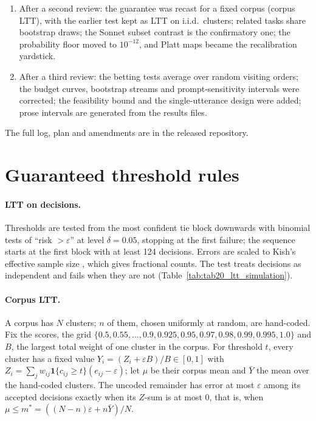 \begin{enumerate}
  adjudication by verdict source, the feasibility calculation and a text-free spend ledger were added; RQ3 point estimates
  were design-weighted; three reporting errors were fixed.
  \item After a second review: the guarantee was recast for a fixed corpus (corpus LTT), with the earlier test kept as LTT
  on i.i.d.\ clusters; related tasks share bootstrap draws; the Sonnet subset contrast is the confirmatory one; the probability
  floor moved to $10^{-12}$, and Platt maps became the recalibration yardstick.
  \item After a third review: the betting tests average over random visiting orders; the budget curves, bootstrap streams and
  prompt-sensitivity intervals were corrected; the feasibility bound and the single-utterance design were added; prose
  intervals are generated from the results files.
\end{enumerate}
The full log, plan and amendments are in the released repository.

\section{Guaranteed threshold rules}
\label{app:ltt}

\paragraph{LTT on decisions.} Thresholds are tested from the most confident tie block downwards with binomial tests of
``risk $>\varepsilon$'' at level $\delta=0.05$, stopping at the first failure; the sequence starts at the first block with at least
124 decisions. Errors are scaled to Kish's effective sample size \citep{kish1965survey}, which gives fractional counts. The test
treats decisions as independent and fails when they are not (Table~\ref{tab:tab20_ltt_simulation}).

\paragraph{Corpus LTT.} A corpus has $N$ clusters; $n$ of them, chosen uniformly at random, are hand-coded. Fix the scores, the
grid $\{0.5, 0.55, \dots, 0.9, 0.925, 0.95, 0.97, 0.98, 0.99, 0.995, 1.0\}$ and $B$, the largest total weight of one cluster in
the corpus. For threshold $t$, every cluster has a fixed value $Y_i=(Z_i+\varepsilon B)/B\in[0,1]$ with
$Z_i=\sum_j w_{ij}\mathbf{1}\{c_{ij}\ge t\}(e_{ij}-\varepsilon)$; let $\mu$ be their corpus mean and $\bar Y$ the mean over the
hand-coded clusters. The uncoded remainder has error at most $\varepsilon$ among its accepted decisions exactly when its
$Z$-sum is at most 0, that is, when $\mu\le m^\ast=((N-n)\varepsilon+n\bar Y)/N$.

